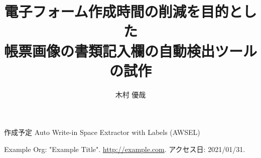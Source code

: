 \documentclass[uplatex, report, a4j, 10pt]{jsbook}
\title{電子フォーム作成時間の削減を目的とした\\帳票画像の書類記入欄の自動検出ツール\toolName の試作\\}
\author{木村 優哉}
\begin{document}
\maketitle


%
%
作成予定
Auto Write-in Space Extractor with Labels (AWSEL)

%
%
















%


%
\begin{thebibliography}{0}
  Example Org: "Example Title". \url{http://example.com}. アクセス日: 2021/01/31.
\end{thebibliography}

\end{document}
